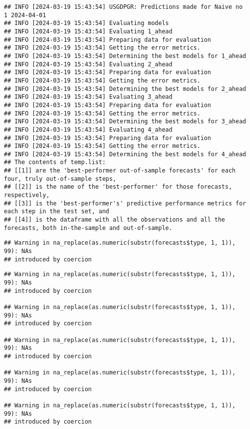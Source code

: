 \documentclass[
]{article}
\begin{document}
\begin{verbatim}
## INFO [2024-03-19 15:43:54] USGDPGR: Predictions made for Naive no  1 2024-04-01
## INFO [2024-03-19 15:43:54] Evaluating models
## INFO [2024-03-19 15:43:54] Evaluating 1_ahead
## INFO [2024-03-19 15:43:54] Preparing data for evaluation
## INFO [2024-03-19 15:43:54] Getting the error metrics.
## INFO [2024-03-19 15:43:54] Determining the best models for 1_ahead
## INFO [2024-03-19 15:43:54] Evaluating 2_ahead
## INFO [2024-03-19 15:43:54] Preparing data for evaluation
## INFO [2024-03-19 15:43:54] Getting the error metrics.
## INFO [2024-03-19 15:43:54] Determining the best models for 2_ahead
## INFO [2024-03-19 15:43:54] Evaluating 3_ahead
## INFO [2024-03-19 15:43:54] Preparing data for evaluation
## INFO [2024-03-19 15:43:54] Getting the error metrics.
## INFO [2024-03-19 15:43:54] Determining the best models for 3_ahead
## INFO [2024-03-19 15:43:54] Evaluating 4_ahead
## INFO [2024-03-19 15:43:54] Preparing data for evaluation
## INFO [2024-03-19 15:43:54] Getting the error metrics.
## INFO [2024-03-19 15:43:54] Determining the best models for 4_ahead
## The contents of temp.list:
## [[1]] are the 'best-performer out-of-sample forecasts' for each four, truly out-of-sample steps,
## [[2]] is the name of the 'best-performer' for those forecasts, respectively,
## [[3]] is the 'best-performer's' predictive performance metrics for each step in the test set, and
## [[4]] is the dataframe with all the observations and all the forecasts, both in-the-sample and out-of-sample.
\end{verbatim}

\begin{verbatim}
## Warning in na_replace(as.numeric(substr(forecasts$type, 1, 1)), 99): NAs
## introduced by coercion
\end{verbatim}

\begin{verbatim}
## Warning in na_replace(as.numeric(substr(forecasts$type, 1, 1)), 99): NAs
## introduced by coercion

## Warning in na_replace(as.numeric(substr(forecasts$type, 1, 1)), 99): NAs
## introduced by coercion

## Warning in na_replace(as.numeric(substr(forecasts$type, 1, 1)), 99): NAs
## introduced by coercion

## Warning in na_replace(as.numeric(substr(forecasts$type, 1, 1)), 99): NAs
## introduced by coercion

## Warning in na_replace(as.numeric(substr(forecasts$type, 1, 1)), 99): NAs
## introduced by coercion
\end{verbatim}
\end{document}
